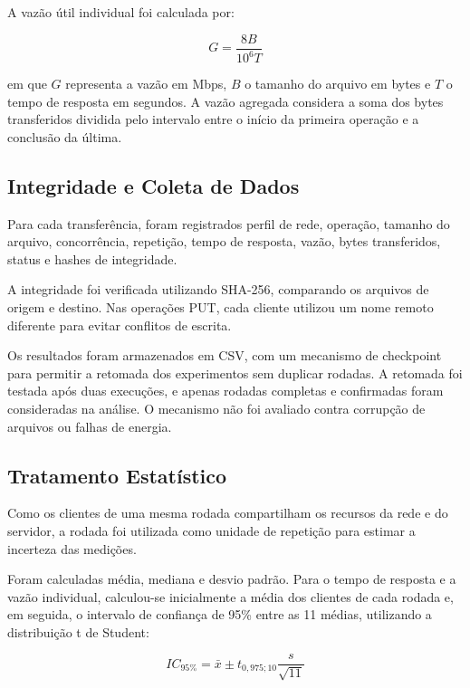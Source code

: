 \documentclass[12pt]{article}
\begin{document}
A vazão útil individual foi calculada por:

\begin{equation}
	G = \frac{8B}{10^6 T}
	\label{eq:vazao}
\end{equation}

\noindent em que $G$ representa a vazão em Mbps, $B$ o tamanho do arquivo em bytes e $T$ o tempo de resposta em segundos. A vazão agregada considera a soma dos bytes transferidos dividida pelo intervalo entre o início da primeira operação e a conclusão da última.

\subsection{Integridade e Coleta de Dados}

Para cada transferência, foram registrados perfil de rede, operação, tamanho do arquivo, concorrência, repetição, tempo de resposta, vazão, bytes transferidos, status e hashes de integridade.

A integridade foi verificada utilizando SHA-256, comparando os arquivos de origem e destino. Nas operações PUT, cada cliente utilizou um nome remoto diferente para evitar conflitos de escrita.

Os resultados foram armazenados em CSV, com um mecanismo de checkpoint para permitir a retomada dos experimentos sem duplicar rodadas. A retomada foi testada após duas execuções, e apenas rodadas completas e confirmadas foram consideradas na análise. O mecanismo não foi avaliado contra corrupção de arquivos ou falhas de energia.

\subsection{Tratamento Estatístico}

Como os clientes de uma mesma rodada compartilham os recursos da rede e do servidor, a rodada foi utilizada como unidade de repetição para estimar a incerteza das medições.

Foram calculadas média, mediana e desvio padrão. Para o tempo de resposta e a vazão individual, calculou-se inicialmente a média dos clientes de cada rodada e, em seguida, o intervalo de confiança de 95\% entre as 11 médias, utilizando a distribuição t de Student:

\begin{equation}
	IC_{95\%} = \bar{x} \pm
	t_{0{,}975;10}\frac{s}{\sqrt{11}}
	\label{eq:intervalo}
\end{equation}
\end{document}
